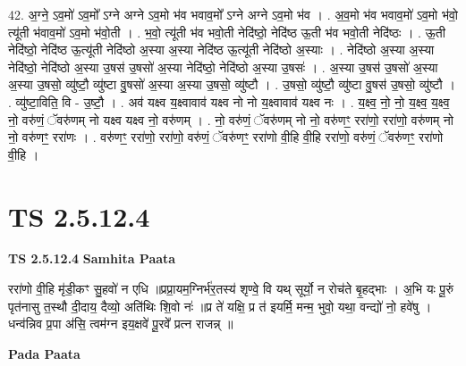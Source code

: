 \documentclass[17pt]{extarticle}
\begin{document}
42. अ॒ग्ने॒ ऽव॒मो॑ ऽव॒मो᳚ ऽग्ने अग्ने ऽव॒मो भ॑व भवाव॒मो᳚ ऽग्ने अग्ने ऽव॒मो भ॑व । . अ॒व॒मो भ॑व भवाव॒मो॑ ऽव॒मो भ॑वो॒ त्यू॑ती भ॑वाव॒मो॑ ऽव॒मो भ॑वो॒ती । . भ॒वो॒ त्यू॑ती भ॑व भवो॒ती नेदि॑ष्ठो॒ नेदि॑ष्ठ ऊ॒ती भ॑व भवो॒ती नेदि॑ष्ठः । . ऊ॒ती नेदि॑ष्ठो॒ नेदि॑ष्ठ ऊ॒त्यू॑ती नेदि॑ष्ठो अ॒स्या अ॒स्या नेदि॑ष्ठ ऊ॒त्यू॑ती नेदि॑ष्ठो अ॒स्याः । . नेदि॑ष्ठो अ॒स्या अ॒स्या नेदि॑ष्ठो॒ नेदि॑ष्ठो अ॒स्या उ॒षस॑ उ॒षसो॑ अ॒स्या नेदि॑ष्ठो॒ नेदि॑ष्ठो अ॒स्या उ॒षसः॑ । . अ॒स्या उ॒षस॑ उ॒षसो॑ अ॒स्या अ॒स्या उ॒षसो॒ व्यु॑ष्टौ॒ व्यु॑ष्टा वु॒षसो॑ अ॒स्या अ॒स्या उ॒षसो॒ व्यु॑ष्टौ । . उ॒षसो॒ व्यु॑ष्टौ॒ व्यु॑ष्टा वु॒षस॑ उ॒षसो॒ व्यु॑ष्टौ । . व्यु॑ष्टा॒विति॒ वि - उ॒ष्टौ॒ । . अव॑ यक्ष्व य॒क्ष्वावाव॑ यक्ष्व नो नो य॒क्ष्वावाव॑ यक्ष्व नः । . य॒क्ष्व॒ नो॒ नो॒ य॒क्ष्व॒ य॒क्ष्व॒ नो॒ वरु॑णं॒ ॅवरु॑णम् नो यक्ष्व यक्ष्व नो॒ वरु॑णम् । . नो॒ वरु॑णं॒ ॅवरु॑णम् नो नो॒ वरु॑णꣳ॒॒ ररा॑णो॒ ररा॑णो॒ वरु॑णम् नो नो॒ वरु॑णꣳ॒॒ ररा॑णः । . वरु॑णꣳ॒॒ ररा॑णो॒ ररा॑णो॒ वरु॑णं॒ ॅवरु॑णꣳ॒॒ ररा॑णो वी॒हि वी॒हि ररा॑णो॒ वरु॑णं॒ ॅवरु॑णꣳ॒॒ ररा॑णो वी॒हि । \newline
\pagebreak
{}

\section{ TS 2.5.12.4 }

\textbf{TS 2.5.12.4 } \newline
\textbf{Samhita Paata} \newline

ररा॑णो वी॒हि मृ॑डी॒कꣳ सु॒हवो॑ न एधि ॥प्रप्रा॒यम॒ग्निर्भ॑र॒तस्य॑ शृण्वे॒ वि यथ् सूर्यो॒ न रोच॑ते बृ॒हद्भाः । अ॒भि यः पू॒रुं पृत॑नासु त॒स्थौ दी॒दाय॒ दैव्यो॒ अति॑थिः शि॒वो नः॑ ॥प्र ते॑ यक्षि॒ प्र त॑ इयर्मि॒ मन्म॒ भुवो॒ यथा॒ वन्द्यो॑ नो॒ हवे॑षु । धन्व॑न्निव प्र॒पा अ॑सि॒ त्वम॑ग्न इय॒क्षवे॑ पू॒रवे᳚ प्रत्न राजन्न् ॥ \newline

\textbf{Pada Paata} \newline
\end{document}
